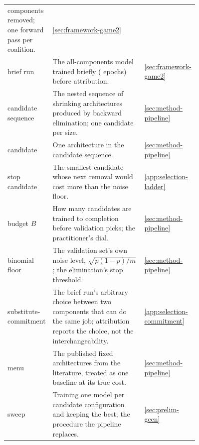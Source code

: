 \begin{table}[h]
\begin{tabular}{p{0.20\linewidth}p{0.56\linewidth}l}
  components removed; one forward pass per coalition.
  & \cref{sec:framework-game2} \\
brief run & The all-components model trained briefly
  (\unfrozen{\ResStemEpochs} epochs) before attribution.
  & \cref{sec:framework-game2} \\
candidate sequence & The nested sequence of shrinking architectures
  produced by backward elimination; one candidate per size.
  & \cref{sec:method-pipeline} \\
candidate & One architecture in the candidate sequence.
  & \cref{sec:method-pipeline} \\
stop candidate & The smallest candidate whose next removal would cost
  more than the noise floor. & \cref{app:selection-ladder} \\
budget $B$ & How many candidates are trained to completion before
  validation picks; the practitioner's dial.
  & \cref{sec:method-pipeline} \\
binomial floor & The validation set's own noise level,
  $\sqrt{p(1-p)/m}$; the elimination's stop threshold.
  & \cref{sec:method-pipeline} \\
substitute-commitment & The brief run's arbitrary choice between two
  components that can do the same job; attribution reports the choice,
  not the interchangeability. & \cref{app:selection-commitment} \\
menu & The \unfrozen{\ResMenuEntries} published fixed architectures
  from the literature, treated as one baseline at its true cost.
  & \cref{sec:method-pipeline} \\
sweep & Training one model per candidate configuration and keeping the
  best; the procedure the pipeline replaces. & \cref{sec:prelim-gccn} \\
\bottomrule
\end{tabular}
\end{table}
